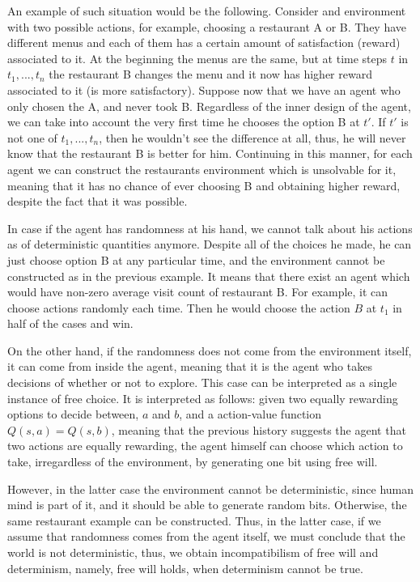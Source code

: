 \documentclass[a4paper]{article}
\begin{document}
An example of such situation would be the following. Consider and environment with two possible actions, for example, choosing a restaurant A or B. They have different menus and each of them has a certain amount of satisfaction (reward) associated to it. At the beginning the menus are the same, but at time steps $t$ in $t_1,...,t_n$ the restaurant B changes the menu and it now has higher reward associated to it (is more satisfactory). Suppose now that we have an agent who only chosen the A, and never took B. Regardless of the inner design of the agent, we can take into account the very first time he chooses the option B at $t'$. If $t'$ is not one of $t_1,...,t_n$, then he wouldn't see the difference at all, thus, he will never know that the restaurant B is better for him. Continuing in this manner, for each agent we can construct the restaurants environment which is unsolvable for it, meaning that it has no chance of ever choosing B and obtaining higher reward, despite the fact that it was possible.

In case if the agent has randomness at his hand, we cannot talk about his actions as of deterministic quantities anymore. Despite all of the choices he made, he can just choose option B at any particular time, and the environment cannot be constructed as in the previous example. It means that there exist an agent which would have non-zero average visit count of restaurant B. For example, it can choose actions randomly each time. Then he would choose the action $B$ at $t_1$ in half of the cases and win.


On the other hand, if the randomness does not come from the environment itself, it can come from inside the agent, meaning that it is the agent who takes decisions of whether or not to explore. This case can be interpreted as a single instance of free choice. It is interpreted as follows: given two equally rewarding options to decide between, $a$ and $b$, and a action-value function \cite{sutton} $Q(s, a)=Q(s, b)$, meaning that the previous history suggests the agent that two actions are equally rewarding, the agent himself can choose which action to take, irregardless of the environment, by generating one bit using free will.

However, in the latter case the environment cannot be deterministic, since human mind is part of it, and it should be able to generate random bits. Otherwise, the same restaurant example can be constructed. Thus, in the latter case, if we assume that randomness comes from the agent itself, we must conclude that the world is not deterministic, thus, we obtain incompatibilism of free will and determinism, namely, free will holds, when determinism cannot be true.
\end{document}
